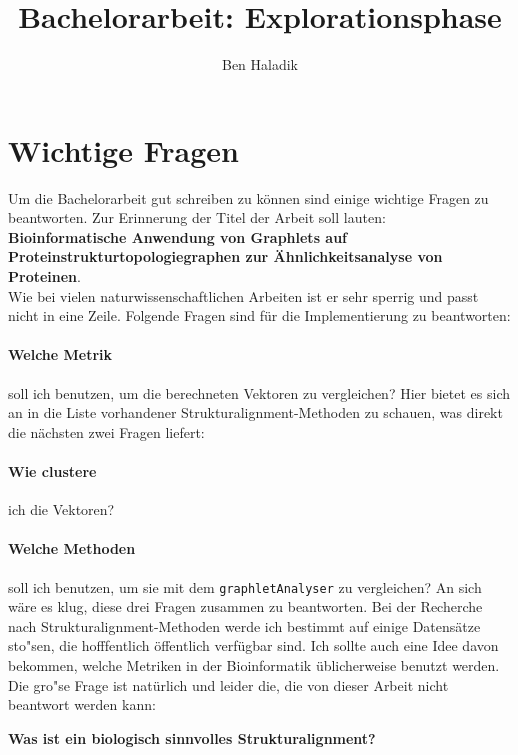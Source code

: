 \documentclass{article}
\author{Ben Haladik}
\title{Bachelorarbeit: Explorationsphase}
\begin{document}
\maketitle
\newpage

\tableofcontents
\newpage

\section{Wichtige Fragen}

Um die Bachelorarbeit gut schreiben zu k\"onnen sind einige wichtige Fragen zu beantworten.
Zur Erinnerung der Titel der Arbeit soll lauten: \\
\textbf{Bioinformatische Anwendung von Graphlets auf Proteinstrukturtopologiegraphen zur \"Ahnlichkeitsanalyse von Proteinen}. \\
Wie bei vielen naturwissenschaftlichen Arbeiten ist er sehr sperrig und passt nicht in eine Zeile.
Folgende Fragen sind f\"ur die Implementierung zu beantworten:

\paragraph{Welche Metrik} soll ich benutzen, um die berechneten Vektoren zu vergleichen? Hier bietet es sich an in die Liste vorhandener Strukturalignment-Methoden zu schauen, was direkt die n\"achsten zwei Fragen liefert:
\paragraph{Wie clustere} ich die Vektoren?

\paragraph{Welche Methoden} soll ich benutzen, um sie mit dem \texttt{graphletAnalyser} zu vergleichen?
An sich w\"are es klug, diese drei Fragen zusammen zu beantworten. Bei der Recherche nach Strukturalignment-Methoden werde ich bestimmt auf einige Datens\"atze sto"sen, die hofffentlich \"offentlich verf\"ugbar sind. Ich sollte auch eine Idee davon bekommen, welche Metriken in der Bioinformatik \"ublicherweise benutzt werden. Die gro"se Frage ist nat\"urlich und leider die, die von dieser Arbeit nicht beantwort werden kann:

\textbf{Was ist ein biologisch sinnvolles Strukturalignment?} \\
\end{document}
